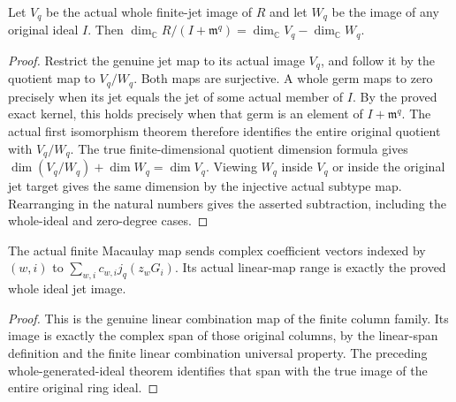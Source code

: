 \begin{theorem}
\label{hir:actual-whole-point-quotient-jet-rank}
\leanok
{}
Let $V_q$ be the actual whole finite-jet image of $R$ and let $W_q$ be
the image of any original ideal $I$. Then
$\dim_{\mathbb C}R/(I+\mathfrak m^q)=\dim_{\mathbb C}V_q-\dim_{\mathbb C}W_q$.
\end{theorem}
\begin{proof}
Restrict the genuine jet map to its actual image $V_q$, and follow it by
the quotient map to $V_q/W_q$. Both maps are surjective. A whole germ
maps to zero precisely when its jet equals the jet of some actual member
of $I$. By the proved exact kernel, this holds precisely when that germ
is an element of $I+\mathfrak m^q$. The actual first isomorphism theorem
therefore identifies the entire original quotient with $V_q/W_q$.
The true finite-dimensional quotient dimension formula gives
$\dim(V_q/W_q)+\dim W_q=\dim V_q$. Viewing $W_q$ inside $V_q$ or inside
the original jet target gives the same dimension by the injective actual
subtype map. Rearranging in the natural numbers gives the asserted
subtraction, including the whole-ideal and zero-degree cases.
\end{proof}

\begin{definition}
\label{hir:actual-finite-macaulay-linear-map}
\leanok
{}
The actual finite Macaulay map sends complex coefficient vectors indexed
by $(w,i)$ to $\sum_{w,i}c_{w,i}j_q(z_wG_i)$. Its actual linear-map range
is exactly the proved whole ideal jet image.
\end{definition}
\begin{proof}
This is the genuine linear combination map of the finite column family.
Its image is exactly the complex span of those original columns, by the
linear-span definition and the finite linear combination universal property.
The preceding whole-generated-ideal theorem identifies that span with
the true image of the entire original ring ideal.
\end{proof}

